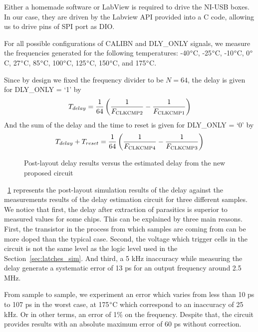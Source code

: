 Either a homemade software or LabView is required to drive the NI-USB boxes. In our case, they are driven by the Labview API provided into a C code, allowing us to drive pins of SPI port as DIO.

For all possible configurations of CALIBN and DLY\_ONLY signals, we measure the frequencies generated for the following temperatures: -40$\degree$C, -25$\degree$C, -10$\degree$C, 0$\degree$C, 27$\degree$C, 85$\degree$C, 100$\degree$C, 125$\degree$C, 150$\degree$C, and 175$\degree$C.

Since by design we fixed the frequency divider to be $N = 64$, the delay is given for DLY\_ONLY = `1' by
\begin{equation}
 T_{delay} = \frac{1}{64} \left(\frac{1}{F_{\rm CLKCMP2}}-\frac{1}{F_{\rm CLKCMP1}} \right)
\end{equation}
And the sum of the delay and the time to reset is given for DLY\_ONLY = `0' by
\begin{equation}
    T_{delay}+T_{reset} = \frac{1}{64} \left(\frac{1}{F_{\rm CLKCMP4}}-\frac{1}{F_{\rm CLKCMP3}} \right)
\end{equation}

\begin{figure}[htp]
    \centering
    
    \caption{Post-layout delay results versus the estimated delay from the new proposed circuit}
    \label{fig:delay_vs_meas}
\end{figure}

\figurename~\ref{fig:delay_vs_meas} represents the post-layout simulation results of the delay against the measurements results of the delay estimation circuit for three different samples. We notice that first, the delay after extraction of parasitics is superior to measured values for some chips. This can be explained by three main reasons. First, the transistor in the process from which samples are coming from can be more doped than the typical case. Second, the voltage which trigger cells in the circuit is not the same level as the logic level used in the Section~\ref{sec:latches_sim}. And third, a 5 kHz inaccuracy while measuring the delay generate a systematic error of 13 ps for an output frequency around 2.5 MHz.

From sample to sample, we experiment an error which varies from less than 10 ps to 107 ps in the worst case, at 175\(\degree\)C which correspond to an inaccuracy of 25 kHz. Or in other terms, an error of 1\% on the frequency. Despite that, the circuit provides results with an absolute maximum error of 60 ps without correction.

